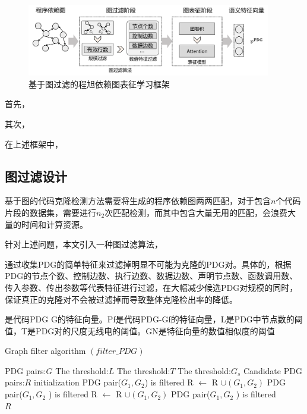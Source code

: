\begin{figure}[H]
  \centering
  \includegraphics[width=0.95\textwidth]{figures/pdgframework.png}
  \caption{基于图过滤的程旭依赖图表征学习框架}\label{fig:pdgframework}
\end{figure}

首先，

其次，

在上述框架中，


\subsection{图过滤设计}
\label{subsec:PDGPreModel}

基于图的代码克隆检测方法需要将生成的程序依赖图两两匹配，对于包含$n$个代码片段的数据集，需要进行$n_2$次匹配检测，而其中包含大量无用的匹配，会浪费大量的时间和计算资源。


针对上述问题，本文引入一种图过滤算法，



通过收集PDG的简单特征来过滤掉明显不可能为克隆的PDG对。具体的，根据PDG的节点个数、控制边数、执行边数、数据边数、声明节点数、函数调用数、传入参数、传出参数等代表特征进行过滤，在大幅减少候选PDG对规模的同时，保证真正的克隆对不会被过滤掉而导致整体克隆检出率的降低。

是代码PDG G的特征向量。Pf是代码PDG-Gf的特征向量，L是PDG中节点数的阈值，T是PDG对的尺度无线电的阈值。GN是特征向量的数值相似度的阈值

\begin{algorithm}[ht]  
	\renewcommand{\algorithmicrequire}{\textbf{Input:}}
	\renewcommand{\algorithmicensure}{\textbf{Output:}}
	\caption{Graph filter algorithm $\left(filter\_PDG\right)$}  
	\label{alg3}
	\begin{algorithmic}[1]
    \Require PDG pairs:$G$
    \Require The threshold:$L$
    \Require The threshold:$T$
    \Require The threshold:$G_s$
		\Ensure Candidate PDG pairs:$R$
    \State initialization
        \State PDG pair($G_1,G_2$) is filtered
      \Else
            \State R $\leftarrow$ R $\cup \left(G_1,G_2\right)$
          \Else
            \State PDG pair($G_1,G_2$ ) is filtered
          \EndIf
        \Else
            \State R $\leftarrow$ R $\cup \left(G_1,G_2\right)$
          \Else
            \State PDG pair($G_1,G_2$ ) is filtered
          \EndIf
        \EndIf
      \EndIf 
    \EndFor \\
    \Return $R$
	\end{algorithmic}
\end{algorithm}

